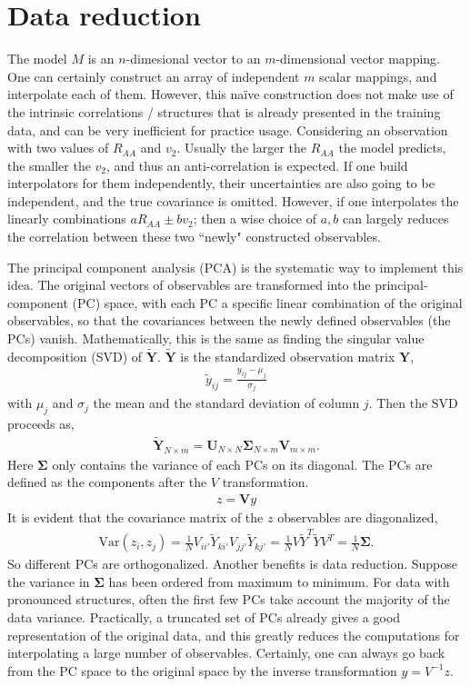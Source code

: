 \section{Data reduction}
The model $M$ is an $n$-dimesional vector to an $m$-dimensional vector mapping. 
One can certainly construct an array of independent $m$ scalar mappings, and interpolate each of them.
However, this na\"ive construction does not make use of the intrinsic correlations / structures that is already presented in the training data, and can be very inefficient for practice usage.
Considering an observation with two values of $R_{AA}$ and $v_2$. Usually the larger the $R_{AA}$ the model predicts, the smaller the $v_2$, and thus an anti-correlation is expected.
If one build interpolators for them independently, their uncertainties are also going to be independent, and the true covariance is omitted.
However, if one interpolates the linearly combinations $a R_{AA} \pm b v_2$; then a wise choice of $a, b$ can largely reduces the correlation between these two ``newly" constructed observables.

The principal component analysis (PCA) is the systematic way to implement this idea.
The original vectors of observables are transformed into the principal-component (PC) space, with each PC a specific linear combination of the original observables, so that the covariances between the newly defined observables (the PCs) vanish.
Mathematically, this is the same as finding the singular value decomposition (SVD) of $\mathbf{\tilde{Y}}$. 
$\mathbf{\tilde{Y}}$ is the standardized observation matrix $\mathbf{Y}$,
\begin{eqnarray}
\tilde{y}_{ij} = \frac{y_{ij} - \mu_j}{\sigma_j}
\end{eqnarray}
with $\mu_j$ and $\sigma_j$ the mean and the standard deviation of column $j$.
Then the SVD proceeds as,
\begin{eqnarray}
\tilde{\mathbf{Y}}_{N\times m} = \mathbf{U}_{N\times N} \mathbf{\Sigma}_{N\times m} \mathbf{V}_{m\times m}.
\end{eqnarray}
Here $\mathbf{\Sigma}$ only contains the variance of each PCs on its diagonal.
The PCs are defined as the components after the $V$ transformation.
\begin{eqnarray}
z = \mathbf{V}y
\end{eqnarray}
It is evident that the covariance matrix of the $z$ observables are diagonalized,
\begin{eqnarray}
\mathrm{Var}(z_i, z_j) = \frac{1}{N}V_{ii'}\tilde{Y}_{ki'}V_{jj'}\tilde{Y}_{kj'} = \frac{1}{N}V\tilde{Y}^T\tilde{Y}V^T = \frac{1}{N}\mathbf{\Sigma}.
\end{eqnarray}
So different PCs are orthogonalized.
Another benefits is data reduction. 
Suppose the variance in $\mathbf{\Sigma}$ has been ordered from maximum to minimum.
For data with pronounced structures, often the first few PCs take account the majority of the data variance.
Practically, a truncated set of PCs already gives a good representation of the original data, and this greatly reduces the computations for interpolating a large number of observables.
Certainly, one can always go back from the PC space to the original space by the inverse transformation $y = V^{-1} z$.

